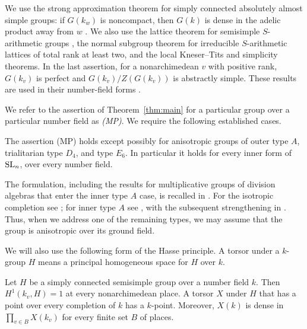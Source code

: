 We use the strong approximation theorem for simply connected absolutely
almost simple groups: if \(G(k_w)\) is noncompact, then \(G(k)\) is dense
in the adelic product away from \(w\)
\cite[Theorem 7.12]{PRbook}.  We also use the lattice theorem
for semisimple \(S\)-arithmetic groups
\cite[Theorem~5.7(1)]{PRbook}, the normal subgroup theorem for
irreducible \(S\)-arithmetic lattices of total rank at least two, and the
local Kneser--Tits and simplicity theorems.  In the last assertion, for
a nonarchimedean \(v\) with positive rank, \(G(k_v)\) is perfect and
\(G(k_v)/Z(G(k_v))\) is abstractly simple.
These results are used in their number-field forms
\cite[Chapters VII and IX]{PRbook}\cite[Chapter VIII, Theorem A]{Margulis}.

We refer to the assertion of Theorem~\ref{thm:main} for a particular
group over a particular number field as \emph{(MP)}.  We require the
following established cases.

\begin{theorem}\label{thm:known-mp}
The assertion (MP) holds except possibly for anisotropic groups of
outer type \(A\), trialitarian type \(D_4\), and type \(E_6\).
In particular it holds for every inner form of \(\operatorname{SL}_n\), over every
number field.
\end{theorem}

The formulation, including the results for multiplicative groups of
division algebras that enter the inner type \(A\) case, is recalled in
\cite[Sections 3.4--3.5]{PRsurvey}. For the isotropic completion see
\cite[Theorem~8.1]{Gille2009}; for inner type \(A\) see
\cite{RapinchukPotapchik1996,Segev1999,SegevSeitz2002}, with the subsequent
strengthening in \cite{RapinchukSegevSeitz2002}.
Thus, when we address one of the remaining types, we may assume that
the group is anisotropic over its ground field.

We will also use the following form of the Hasse principle.  A torsor
under a \(k\)-group \(H\) means a principal homogeneous space for \(H\)
over \(k\).

\begin{theorem}
\label{thm:foundations-hasse}
Let \(H\) be a simply connected semisimple group over a number field
\(k\).  Then \(H^1(k_v,H)=1\) at every nonarchimedean place.  A torsor
\(X\) under \(H\) that has a point over every completion of \(k\) has
a \(k\)-point.  Moreover, \(X(k)\) is dense in
\(\prod_{v\in B}X(k_v)\) for every finite set \(B\) of places.
\end{theorem}

